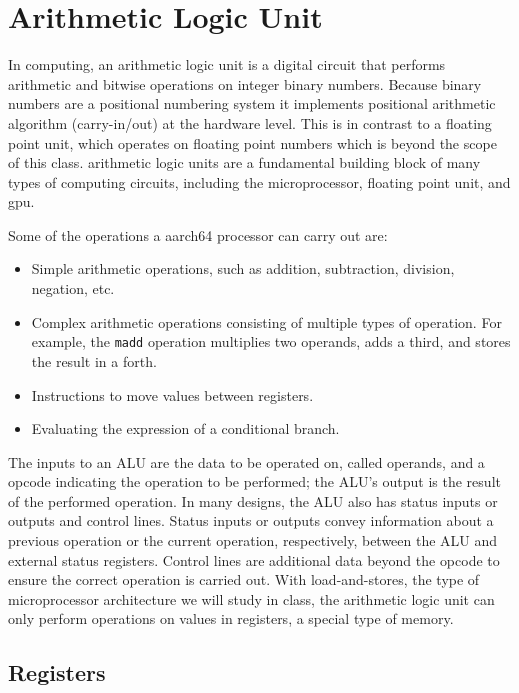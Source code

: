 \documentclass[letterpaper, 12pt]{book}
\begin{document}
\section{Arithmetic Logic Unit\label{sec:alu}}

In computing, an \gls{arithmetic logic unit} is a digital circuit that performs arithmetic and bitwise operations 
on integer binary numbers. Because binary numbers are a positional numbering system it implements positional 
arithmetic algorithm (carry-in/out) at the hardware level. %
This is in contrast to a \gls{floating point unit}, which operates on floating point 
numbers which is beyond the scope of this class. \glspl{arithmetic logic unit} are a fundamental building block of many types of computing 
circuits, including the microprocessor, \gls{floating point unit}, and \gls{gpu}. 

Some of the operations a \gls{aarch64} processor can carry out are:

\begin{itemize}
    \item Simple arithmetic operations, such as addition, subtraction, division, negation, etc. 
    \item Complex arithmetic operations consisting of multiple types of operation. For example, the \texttt{madd} 
     operation multiplies two operands, adds a third, and stores the result in a forth.
    \item Instructions to move values between registers.
    \item Evaluating the expression of a conditional branch.
\end{itemize}

The inputs to an ALU are the data to be operated on, called operands, and a \gls{opcode} indicating the operation to be 
performed; the ALU's output is the result of the performed operation. In many designs, the ALU also has status 
inputs or outputs and control lines. Status inputs or outputs convey information about a previous operation 
or the current operation, respectively, between the ALU and external status registers. Control lines are additional 
data beyond the \gls{opcode} to ensure the correct operation is carried out. With \glspl{load-and-store}, the type 
of microprocessor architecture we will study in class, the \gls{arithmetic logic unit} can only perform 
operations on values in \glspl{register}, a special type of memory.

\subsection{Registers\label{sec:alu:reg}}
\end{document}

